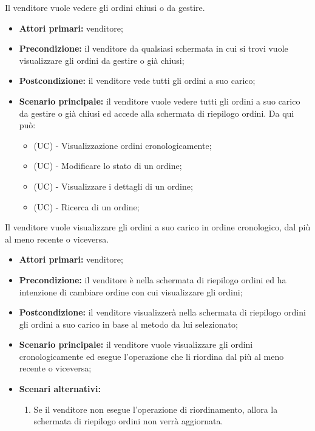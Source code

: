 Il venditore vuole vedere gli ordini chiusi o da gestire.
\begin{itemize}
    \item \textbf{Attori primari:} venditore;
    \item \textbf{Precondizione:} il venditore da qualsiasi schermata in cui si trovi vuole visualizzare gli ordini da gestire o già chiusi;
    \item \textbf{Postcondizione:} il venditore vede tutti gli ordini a suo carico;
    \item \textbf{Scenario principale:} il venditore vuole vedere tutti gli ordini a suo carico da gestire o già chiusi ed accede alla schermata di riepilogo ordini. Da qui può:
    \begin{itemize}
    	\item (UC) - Visualizzazione ordini cronologicamente;
        \item (UC) - Modificare lo stato di un ordine;
        \item (UC) - Visualizzare i dettagli di un ordine;
        \item (UC) - Ricerca di un ordine;
    \end{itemize}
\end{itemize}

\resetSubUC
{}
Il venditore vuole visualizzare gli ordini a suo carico in ordine cronologico, dal più al meno recente o viceversa.
\begin{itemize}
	\item \textbf{Attori primari:} venditore;
	\item \textbf{Precondizione:} il venditore è nella schermata di riepilogo ordini ed ha intenzione di cambiare ordine con cui visualizzare gli ordini;
	\item \textbf{Postcondizione:} il venditore visualizzerà nella schermata di riepilogo ordini gli ordini a suo carico in base al metodo da lui selezionato;
	\item \textbf{Scenario principale:} il venditore vuole visualizzare gli ordini cronologicamente ed esegue l'operazione che li riordina dal più al meno recente o viceversa;
	\item \textbf{Scenari alternativi:}
	\begin{enumerate}[label=\lett]
		\item Se il venditore non esegue l'operazione di riordinamento, allora la schermata di riepilogo ordini non verrà aggiornata.
	\end{enumerate}
\end{itemize}

